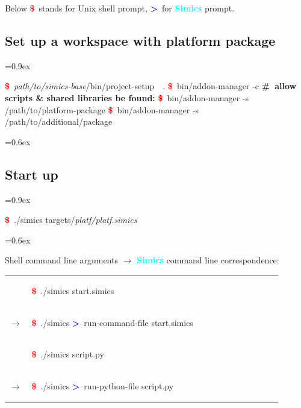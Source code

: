 \documentclass[8pt]{extarticle}
\newenvironment{code}[1][]{%
\begin{prebox}[#1]\obeylines%
\fontdimen2\font=0.9ex%
}{%
\end{prebox}%
\fontdimen2\font=0.6ex%
}
\newenvironment{codem}[2][\linewidth]{%
\begin{minipage}{#1}%
\begin{prebox}[colback=#2]\obeylines}{%
\end{prebox}%
\end{minipage}}
\newenvironment{code9}{%
\begin{codem}[0.9\linewidth]{green!15}}{\end{codem}}
\newcommand{\prompt}{\textcolor{red}{\textbf{\$}\ }}
\newcommand{\sprompt}{\textcolor{blue}{\textbf{>}\ }}
\newcommand{\cmtcommon}[1]{\textcolor{Sepia}{\textbf{#1}}}
\newcommand{\cmt}[1]{\cmtcommon{\#\ #1}}
\newcommand{\p}[1]{\textit{\large#1}}
\newcommand{\Simics}{\textcolor{cyan}{\textbf{Simics}}}
\begin{document}
\begin{multicols*}{3}
    Below \prompt stands for Unix shell prompt, \sprompt for \Simics{} prompt.

\subsection{Set up a workspace with platform package}
    \begin{code}
        \prompt \p{path/to/simics-base}/bin/project-setup\ \ .
        \prompt bin/addon-manager -c
        \cmt{allow scripts \& shared libraries be found:}
        \prompt bin/addon-manager -s /path/to/platform-package
        \prompt bin/addon-manager -s /path/to/additional/package
    \end{code}

\subsection{Start up}
    \begin{code}
        \prompt ./simics targets/\p{platf/platf.simics}
    \end{code}

    
    Shell command line arguments $\longrightarrow$ \Simics{} command line 
        correspondence:

    \begin{tabular}{p{0.05\linewidth}p{0.85\linewidth}}
        &
        \begin{code9}
            \prompt ./simics start.simics
        \end{code9}
        \vspace{0.05cm}
        \\
        $\longrightarrow$ &
        \begin{code9}
            \prompt ./simics
            \sprompt run-command-file start.simics
        \end{code9}
        \vspace{0.2cm}
        \\

        & \begin{code9}
            \prompt ./simics script.py
        \end{code9}
        \vspace{0.05cm}
        \\
        $\longrightarrow$ &
        \begin{code9}
            \prompt ./simics
            \sprompt run-python-file script.py
        \end{code9}
        \vspace{0.2cm}
        \\


\end{tabular}
\end{multicols*}
\end{document}
